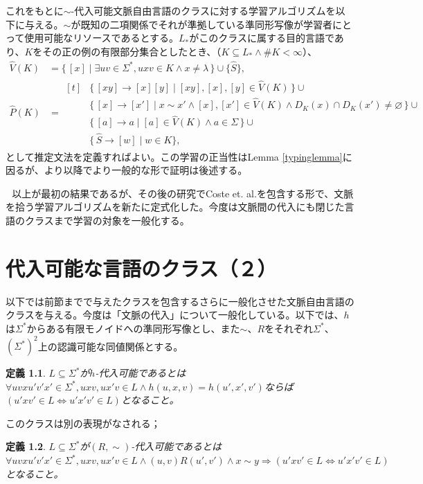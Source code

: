 \documentclass{jsbook}
\renewcommand{\emptyset}{\varnothing}
\newtheorem{definition}{定義}
\begin{document}
これをもとに$\sim$-代入可能文脈自由言語のクラスに対する学習アルゴリズムを以下に与える。$\sim$が既知の二項関係でそれが準拠している準同形写像が学習者にとって使用可能なリソースであるとする。$L_*$がこのクラスに属する目的言語であり、$K$をその正の例の有限部分集合としたとき、（$K\subseteq L_*\land \# K<\infty$）、
\begin{align*}
\hat{V}(K) & = \{\, [x] \mid \exists uv\in\Sigma^*, uxv \in K\land x\neq\lambda \,\}\cup\{\hat{S}\},\\
\hat{P}(K) & =
\begin{aligned}[t]
& \{\, [xy] \to [x][y] \mid [xy], [x], [y] \in \hat{V}(K) \,\}  \cup {}\\
& \{\, [x] \to [x'] \mid x\sim x' \land [x], [x'] \in \hat{V}(K)\land D_K(x)\cap D_K(x')\neq\emptyset \,\} \cup {}\\
& \{\, [a] \to a \mid [a] \in \hat{V}(K)\land a\in\Sigma \,\} \cup {}\\
& \{\, \hat{S}\to [w]  \mid w\in K\},
\end{aligned}
\end{align*}
として推定文法を定義すればよい。この学習の正当性はLemma \ref{typinglemma}に因るが、より以降でより一般的な形で証明は後述する。

\,\,\,\,以上が最初の結果であるが、その後の研究でCoste et. al.\cite{Coste:2012}を包含する形で、文脈を拾う学習アルゴリズムを新たに定式化した。今度は文脈間の代入にも閉じた言語のクラスまで学習の対象を一般化する。


\chapter{代入可能な言語のクラス（２）}

以下では前節までで与えたクラスを包含するさらに一般化させた文脈自由言語のクラスを与える。今度は「文脈の代入」について一般化している。以下では、$h$は$\Sigma^*$からある有限モノイドへの準同形写像とし、また$\sim$、$R$をそれぞれ$\Sigma^*$、$(\Sigma^*)^2$上の認識可能な同値関係とする。\\

\begin{definition}\label{most1}
$L\subseteq\Sigma^*$が$h$-代入可能であるとは$\forall uvxu'v'x'\in\Sigma^*, uxv,ux'v\in L\land h(u,x,v)=h(u',x',v')$ならば$(u'xv'\in L\Leftrightarrow u'x'v'\in L)$となること。
\end{definition}

このクラスは別の表現がなされる；

\begin{definition}\label{most2}
$L\subseteq\Sigma^*$が$(R,\sim)$-代入可能であるとは$\forall uvxu'v'x'\in\Sigma^*, uxv,ux'v\in L\land(u,v)R(u',v')\land x\sim y\Rightarrow(u'xv'\in L\Leftrightarrow u'x'v'\in L)$となること。
\end{definition}
\end{document}

